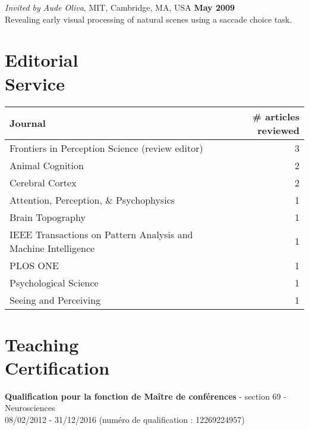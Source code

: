 \documentclass[margin,line]{resume}
\begin{document}
\begin{resume}
\vspace{-2mm} 
\textit{Invited by Aude Oliva}, MIT, Cambridge, MA, USA \hfill \textbf{May 2009}\\
Revealing early visual processing of natural scenes using a saccade choice task.

\normalsize


	\vspace{3mm}
	\section{\mysidestyle Editorial\\Service}

\vspace{3mm}
\begin{table}[ht]
\begin{tabular}{l r}
\textbf{Journal} & \textbf{\# articles reviewed} \\ \hline
Frontiers in Perception Science (review editor) & 3\\
Animal Cognition & 2\\
Cerebral Cortex & 2\\
Attention, Perception, \& Psychophysics & 1\\
Brain Topography & 1\\
IEEE Transactions on Pattern Analysis and Machine Intelligence & 1\\
PLOS ONE & 1\\
Psychological Science & 1\\
Seeing and Perceiving & 1\\
\end{tabular}

\end{table}


	\vspace{3mm}
	\section{\mysidestyle Teaching\\Certification}
    \textbf{Qualification pour la fonction de Maître de conférences} - section 69 - Neurosciences\\
    08/02/2012 - 31/12/2016 (numéro de qualification : 12269224957)


	\vspace{3mm}

\end{resume}
\end{document}
